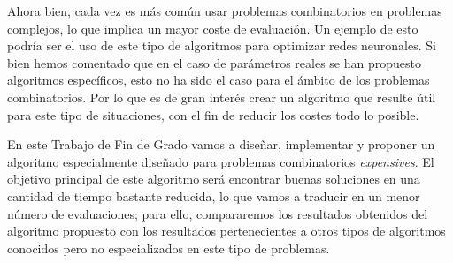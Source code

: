 Ahora bien, cada vez es más común usar problemas combinatorios en problemas complejos, lo que implica un mayor coste de evaluación. 
Un ejemplo de esto podría ser el uso de este tipo de algoritmos para optimizar redes neuronales. 
Si bien hemos comentado que en el caso de parámetros reales se han propuesto algoritmos específicos, esto no ha sido el caso para el ámbito de los problemas combinatorios. 
Por lo que es de gran interés crear un algoritmo que resulte útil para este tipo de situaciones, con el fin de reducir los costes todo lo posible. 

En este Trabajo de Fin de Grado vamos a diseñar, implementar y proponer un algoritmo especialmente diseñado para problemas combinatorios \textit{expensives}. 
El objetivo principal de este algoritmo será encontrar buenas soluciones en una cantidad de tiempo bastante reducida, lo que vamos a traducir en un menor número de evaluaciones; para ello, compararemos los resultados obtenidos del algoritmo propuesto con los resultados pertenecientes a otros tipos de algoritmos conocidos pero no especializados en este tipo de problemas.